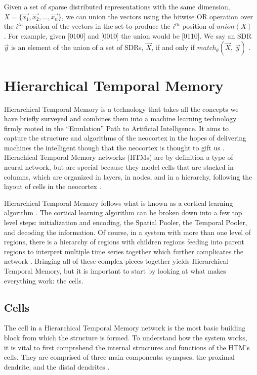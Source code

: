 \documentclass[fleqn,notitlepage,minimal]{article}
\begin{document}
	Given a set of sparse distributed representations with the same dimension, $X =\{\overrightarrow{x_{1}}, \overrightarrow{x_{2}}, ...,\overrightarrow{x_{n}}\}$, we can union the vectors using the bitwise OR operation over the $i^{th}$ position of the vectors in the set to produce the $i^{th}$ position of $union(X)$ \cite{Properties}. For example, given [0100] and [0010] the union would be [0110]. We say an SDR $\overrightarrow{y}$ is an element of the union of a set of SDRs, $\overrightarrow{X}$, if and only if $match_{\theta}(\overrightarrow{X},\ \overrightarrow{y})$ \cite{Properties}.
	
	\section{Hierarchical Temporal Memory}
	
	Hierarchical Temporal Memory is a technology that takes all the concepts we have briefly surveyed and combines them into a machine learning technology firmly rooted in the ``Emulation'' Path to Artificial Intelligence. It aims to capture the structure and algorithms of the neocortex in the hopes of delivering machines the intelligent though that the neocortex is thought to gift us \cite{Whitepaper}. Hierachical Temporal Memory networks (HTMs) are by definition a type of neural network, but are special because they model cells that are stacked in columns, which are organized in layers, in nodes, and in a hierarchy, following the layout of cells in the neocortex \cite{Whitepaper}.
	
	Hierarchical Temporal Memory follows what is known as a cortical learning algorithm \cite{Principles}. The cortical learning algorithm can be broken down into a few top level steps: initialization and encoding, the Spatial Pooler, the Temporal Pooler, and decoding the information. Of course, in a system with more than one level of regions, there is a hierarchy of regions with children regions feeding into parent regions to interpret multiple time series together which further complicates the network \cite{Dillon}. Bringing all of these complex pieces together yields Hierarchical Temporal Memory, but it is important to start by looking at what makes everything work: the cells.
	
	\subsection{Cells}
	
	The cell in a Hierarchical Temporal Memory network is the most basic building block from which the structure is formed. To understand how the system works, it is vital to first comprehend the internal structures and functions of the HTM's cells. They are comprised of three main components: synapses, the proximal dendrite, and the distal dendrites \cite{Whitepaper}.
	
\end{document}
